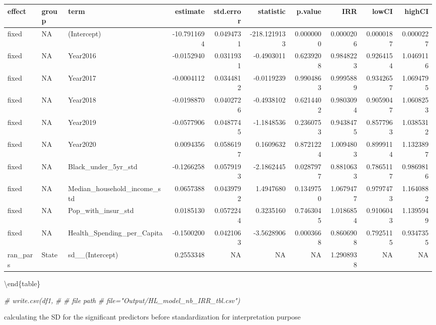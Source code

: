 \documentclass[
]{article}
\newenvironment{Shaded}{\begin{snugshade}}{\end{snugshade}}
\newcommand{\CommentTok}[1]{\textcolor[rgb]{0.56,0.35,0.01}{\textit{#1}}}
\begin{document}
\begin{tabular}[t]{l|l|l|r|r|r|r|r|r|r}
\hline
effect & group & term & estimate & std.error & statistic & p.value & IRR & lowCI & highCI\\
\hline
fixed & NA & (Intercept) & -10.7911694 & 0.0494731 & -218.1219133 & 0.0000000 & 0.0000206 & 0.0000187 & 0.0000227\\
\hline
fixed & NA & Year2016 & -0.0152940 & 0.0311931 & -0.4903011 & 0.6239208 & 0.9848223 & 0.9264154 & 1.0469116\\
\hline
fixed & NA & Year2017 & -0.0004112 & 0.0344812 & -0.0119239 & 0.9904863 & 0.9995889 & 0.9342657 & 1.0694795\\
\hline
fixed & NA & Year2018 & -0.0198870 & 0.0402726 & -0.4938102 & 0.6214402 & 0.9803094 & 0.9059047 & 1.0608253\\
\hline
fixed & NA & Year2019 & -0.0577906 & 0.0487745 & -1.1848536 & 0.2360753 & 0.9438475 & 0.8577963 & 1.0385312\\
\hline
fixed & NA & Year2020 & 0.0094356 & 0.0586197 & 0.1609632 & 0.8721224 & 1.0094803 & 0.8999114 & 1.1323897\\
\hline
fixed & NA & Black\_under\_5yr\_std & -0.1266258 & 0.0579193 & -2.1862445 & 0.0287977 & 0.8810633 & 0.7865117 & 0.9869816\\
\hline
fixed & NA & Median\_household\_income\_std & 0.0657388 & 0.0439792 & 1.4947680 & 0.1349750 & 1.0679477 & 0.9797473 & 1.1640882\\
\hline
fixed & NA & Pop\_with\_insur\_std & 0.0185130 & 0.0572244 & 0.3235160 & 0.7463045 & 1.0186854 & 0.9106043 & 1.1395949\\
\hline
fixed & NA & Health\_Spending\_per\_Capita & -0.1500200 & 0.0421063 & -3.5628906 & 0.0003668 & 0.8606908 & 0.7925115 & 0.9347355\\
\hline
ran\_pars & State & sd\_\_(Intercept) & 0.2553348 & NA & NA & NA & 1.2908938 & NA & NA\\
\hline
\end{tabular}

\textbackslash end\{table\}

\begin{Shaded}
\begin{Highlighting}[]
\CommentTok{\# write.csv(df1,}
\CommentTok{\#        \# file path}
\CommentTok{\#        file="Output/HL\_model\_nb\_IRR\_tbl.csv")}
\end{Highlighting}
\end{Shaded}

calculating the SD for the significant predictors before standardization
for interpretation purpose
\end{document}
